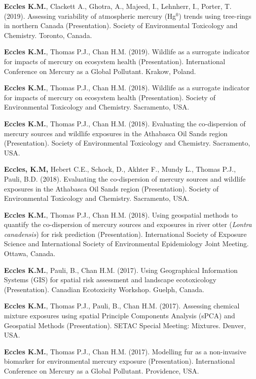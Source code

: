 \documentclass[margin,line]{res}
\begin{document}
\begin{resume}
\textbf{Eccles K.M.}, Clackett A., Ghotra, A., Majeed, I., Lehnherr, I., Porter, T. (2019). Assessing variability of atmospheric mercury (Hg$^{0}$) trends using tree-rings in northern Canada (Presentation). Society of Environmental Toxicology and Chemistry. Toronto, Canada.

\textbf{Eccles K.M.}, Thomas P.J., Chan H.M. (2019). Wildlife as a surrogate indicator for impacts of mercury on ecosystem health (Presentation). International Conference on Mercury as a Global Pollutant. Krakow, Poland.

\textbf{Eccles K.M.}, Thomas P.J., Chan H.M. (2018). Wildlife as a surrogate indicator for impacts of mercury on ecosystem health (Presentation). Society of Environmental Toxicology and Chemistry. Sacramento, USA.

\textbf{Eccles K.M.}, Thomas P.J., Chan H.M. (2018). Evaluating the co-dispersion of mercury sources and wildlife exposures in the Athabasca Oil Sands region (Presentation). Society of Environmental Toxicology and Chemistry. Sacramento, USA.

\textbf{Eccles, K.M,} Hebert C.E., Schock, D., Akhter F., Mundy L., Thomas P.J., Pauli, B.D. (2018). Evaluating the co-dispersion of mercury sources and wildlife exposures in the Athabasca Oil Sands region (Presentation). Society of Environmental Toxicology and Chemistry. Sacramento, USA.

\textbf{Eccles K.M.}, Thomas P.J., Chan H.M. (2018). Using geospatial methods to quantify the co-dispersion of mercury sources and exposures in river otter (\textit{Lontra canadensis}) for risk prediction (Presentation). International Society of Exposure Science and International Society of Environmental Epidemiology Joint Meeting. Ottawa, Canada.

\textbf{Eccles K.M.}, Pauli, B., Chan H.M. (2017). Using Geographical Information Systems (GIS) for spatial risk assessment and landscape ecotoxicology (Presentation). Canadian Ecotoxicity Workshop. Guelph, Canada.

\textbf{Eccles K.M.}, Thomas P.J., Pauli, B., Chan H.M. (2017). Assessing chemical mixture exposures using spatial Principle Components Analysis (sPCA) and Geospatial Methods (Presentation). SETAC Special Meeting: Mixtures. Denver, USA.

\textbf{Eccles K.M.}, Thomas P.J., Chan H.M. (2017).  Modelling fur as a non-invasive biomarker for environmental mercury exposure (Presentation). International Conference on Mercury as a Global Pollutant. Providence, USA.


\end{resume}
\end{document}

